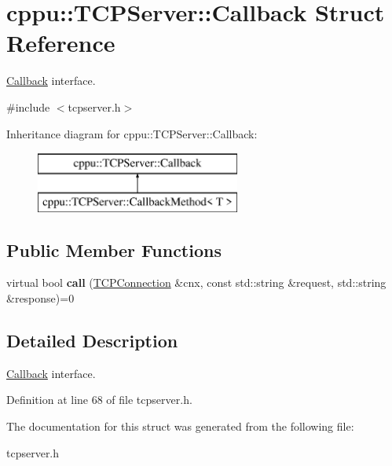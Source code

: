 \hypertarget{structcppu_1_1_t_c_p_server_1_1_callback}{}\section{cppu\+:\+:T\+C\+P\+Server\+:\+:Callback Struct Reference}
\label{structcppu_1_1_t_c_p_server_1_1_callback}


\mbox{\hyperlink{structcppu_1_1_t_c_p_server_1_1_callback}{Callback}} interface.  




{\ttfamily \#include $<$tcpserver.\+h$>$}

Inheritance diagram for cppu\+:\+:T\+C\+P\+Server\+:\+:Callback\+:\begin{figure}[H]
\begin{center}
\leavevmode
\includegraphics[height=2.000000cm]{structcppu_1_1_t_c_p_server_1_1_callback}
\end{center}
\end{figure}
\subsection*{Public Member Functions}
\begin{DoxyCompactItemize}
\item 
\mbox{\label{structcppu_1_1_t_c_p_server_1_1_callback_aabe4b0b30e14ddeb7c0c02aa3a335eba}} 
virtual bool {\bfseries call} (\mbox{\hyperlink{classcppu_1_1_t_c_p_connection}{T\+C\+P\+Connection}} \&cnx, const std\+::string \&request, std\+::string \&response)=0
\end{DoxyCompactItemize}


\subsection{Detailed Description}
\mbox{\hyperlink{structcppu_1_1_t_c_p_server_1_1_callback}{Callback}} interface. 

Definition at line 68 of file tcpserver.\+h.



The documentation for this struct was generated from the following file\+:\begin{DoxyCompactItemize}
\item 
tcpserver.\+h\end{DoxyCompactItemize}

